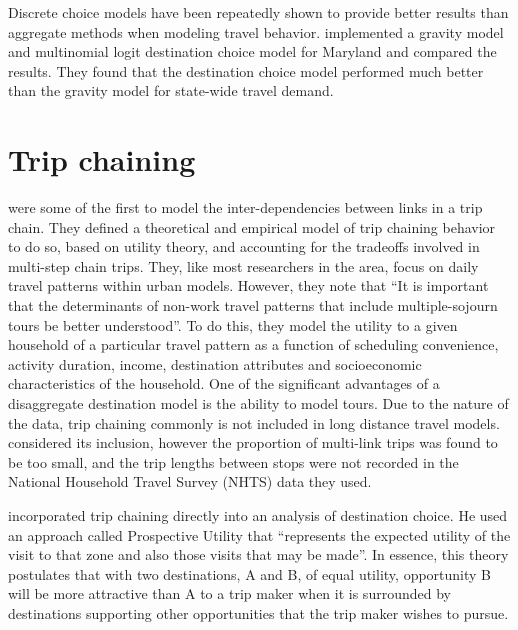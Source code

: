Discrete choice models have been repeatedly shown to provide better results than aggregate methods when modeling travel behavior. \parencite{Stephanedes84, Mishra13} implemented a gravity model and multinomial logit destination choice model for Maryland and compared the results. They found that the destination choice model performed much better than the gravity model for state-wide travel demand. 

\section{Trip chaining}
\textcite{AdlerAkiva79} were some of the first to model the inter-dependencies between links in a trip chain. They defined a theoretical and empirical model of trip chaining behavior to do so, based on utility theory, and accounting for the tradeoffs involved in multi-step chain trips. They, like most researchers in the area, focus on daily travel patterns within urban models. However, they note that \enquote{It is important that the determinants of non-work travel patterns that include multiple-sojourn tours be better understood}. To do this, they model the utility to a given household of a particular travel pattern as a function of scheduling convenience, activity duration, income, destination attributes and socioeconomic characteristics of the household.
One of the significant advantages of a disaggregate destination model is the ability to model tours. Due to the nature of the data, trip chaining commonly is not included in long distance travel models. \textcite{Moeckel15} considered its inclusion, however the proportion of multi-link trips was found to be too small, and the trip lengths between stops were not recorded in the National Household Travel Survey (NHTS) data they used. 

\textcite{Kitamura84} incorporated trip chaining directly into an analysis of destination choice. He used an approach called Prospective Utility that \enquote{represents the expected utility of the visit to that zone and also those visits that may be made}. In essence, this theory postulates that with two destinations, A and B, of equal utility, opportunity B will be more attractive than A to a trip maker when it is surrounded by destinations supporting other opportunities that the trip maker wishes to pursue.

